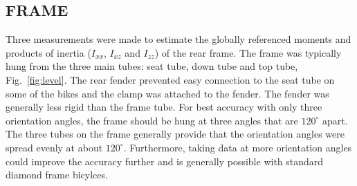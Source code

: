 \documentclass{bmd2010p}
\begin{document}
\subsection{FRAME}
Three measurements were made to estimate the globally referenced moments and
products of inertia ($I_{xx}$, $I_{xz}$ and $I_{zz}$) of the rear frame. The
frame was typically hung from the three main tubes: seat tube, down tube
and top tube, Fig.~\ref{fig:level}. The rear fender prevented easy connection to the seat tube on
some of the bikes and the clamp was attached to the fender. The fender was
generally less rigid than the frame tube. For best accuracy with only three
orientation angles, the frame should be hung at three angles that are
$120^\circ$ apart. The three tubes on the frame generally provide that the
orientation angles were spread evenly at about $120^\circ$. Furthermore, taking
data at more orientation angles could improve the accuracy further and
is generally possible with standard diamond frame bicylces.
\end{document}
